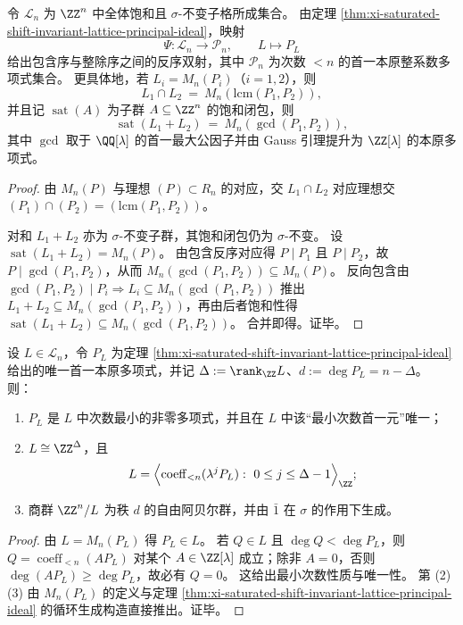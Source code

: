 \begin{corollary}[饱和截断移位不变子格的格结构]\label{cor:xi-saturated-shift-invariant-lattice-gcd-lcm}
令 \(\mathcal L_n\) 为 \(\ZZ^n\) 中全体饱和且 \(\sigma\)-不变子格所成集合。
由定理 \ref{thm:xi-saturated-shift-invariant-lattice-principal-ideal}，映射
\[
\Psi:\mathcal L_n\to \mathcal P_n,\qquad L\mapsto P_L
\]
给出包含序与整除序之间的反序双射，其中 \(\mathcal P_n\) 为次数 \(<n\) 的首一本原整系数多项式集合。
更具体地，若 \(L_i=M_n(P_i)\)（\(i=1,2\)），则
\[
L_1\cap L_2\ =\ M_n(\mathrm{lcm}(P_1,P_2)),
\]
并且记 \(\operatorname{sat}(A)\) 为子群 \(A\subseteq\ZZ^n\) 的饱和闭包，则
\[
\operatorname{sat}(L_1+L_2)\ =\ M_n(\gcd(P_1,P_2)),
\]
其中 \(\gcd\) 取于 \(\QQ[\lambda]\) 的首一最大公因子并由 Gauss 引理提升为 \(\ZZ[\lambda]\) 的本原多项式。
\end{corollary}
\begin{proof}
由 \(M_n(P)\) 与理想 \((P)\subset R_n\) 的对应，交 \(L_1\cap L_2\) 对应理想交 \((P_1)\cap(P_2)=(\mathrm{lcm}(P_1,P_2))\)。
\par
对和 \(L_1+L_2\) 亦为 \(\sigma\)-不变子群，其饱和闭包仍为 \(\sigma\)-不变。
设 \(\operatorname{sat}(L_1+L_2)=M_n(P)\)。
由包含反序对应得 \(P\mid P_1\) 且 \(P\mid P_2\)，故 \(P\mid \gcd(P_1,P_2)\)，从而 \(M_n(\gcd(P_1,P_2))\subseteq M_n(P)\)。
反向包含由 \(\gcd(P_1,P_2)\mid P_i\Rightarrow L_i\subseteq M_n(\gcd(P_1,P_2))\) 推出 \(L_1+L_2\subseteq M_n(\gcd(P_1,P_2))\)，再由后者饱和性得 \(\operatorname{sat}(L_1+L_2)\subseteq M_n(\gcd(P_1,P_2))\)。
合并即得。证毕。
\end{proof}

\begin{proposition}[主生成元的内禀刻画与自然生成系]\label{prop:xi-saturated-shift-invariant-lattice-intrinsic-generator}
设 \(L\in\mathcal L_n\)，令 \(P_L\) 为定理 \ref{thm:xi-saturated-shift-invariant-lattice-principal-ideal} 给出的唯一首一本原多项式，并记 \(\Delta:=\rank_{\ZZ}L\)、\(d:=\deg P_L=n-\Delta\)。
则：
\begin{enumerate}
  \item \(P_L\) 是 \(L\) 中次数最小的非零多项式，并且在 \(L\) 中该“最小次数首一元”唯一；
  \item \(L\cong \ZZ^{\Delta}\)，且
        \[
        L=\Bigl\langle \operatorname{coeff}_{<n}(\lambda^j P_L):\ 0\le j\le \Delta-1\Bigr\rangle_{\ZZ};
        \]
  \item 商群 \(\ZZ^n/L\) 为秩 \(d\) 的自由阿贝尔群，并由 \(\bar 1\) 在 \(\sigma\) 的作用下生成。
\end{enumerate}
\end{proposition}
\begin{proof}
由 \(L=M_n(P_L)\) 得 \(P_L\in L\)。
若 \(Q\in L\) 且 \(\deg Q<\deg P_L\)，则 \(Q=\operatorname{coeff}_{<n}(AP_L)\) 对某个 \(A\in\ZZ[\lambda]\) 成立；除非 \(A=0\)，否则 \(\deg(AP_L)\ge \deg P_L\)，故必有 \(Q=0\)。
这给出最小次数性质与唯一性。
第 (2)(3) 由 \(M_n(P_L)\) 的定义与定理 \ref{thm:xi-saturated-shift-invariant-lattice-principal-ideal} 的循环生成构造直接推出。证毕。
\end{proof}

